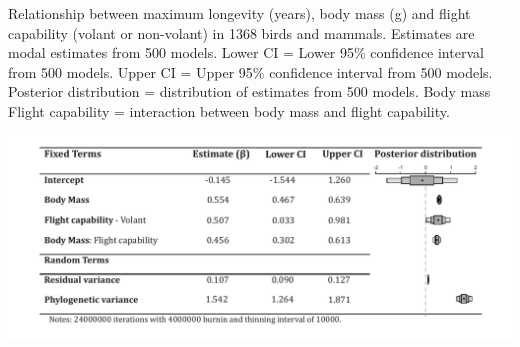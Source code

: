 \begin{table}[h]
  \caption[Table 1.]{Relationship between maximum longevity (years), body mass (g) and flight capability (volant or non-volant) in 1368 birds and mammals. Estimates are modal estimates from 500 models. Lower CI = Lower 95\% confidence interval from 500 models. Upper CI = Upper 95\% confidence interval from 500 models. Posterior distribution = distribution of estimates from 500 models. Body mass \: Flight capability = interaction between body mass and flight capability.}
  \label{tbl:Table 1.}
  \includegraphics[width=\linewidth]{ch3-longevity/Table1.pdf}
\end{table}


